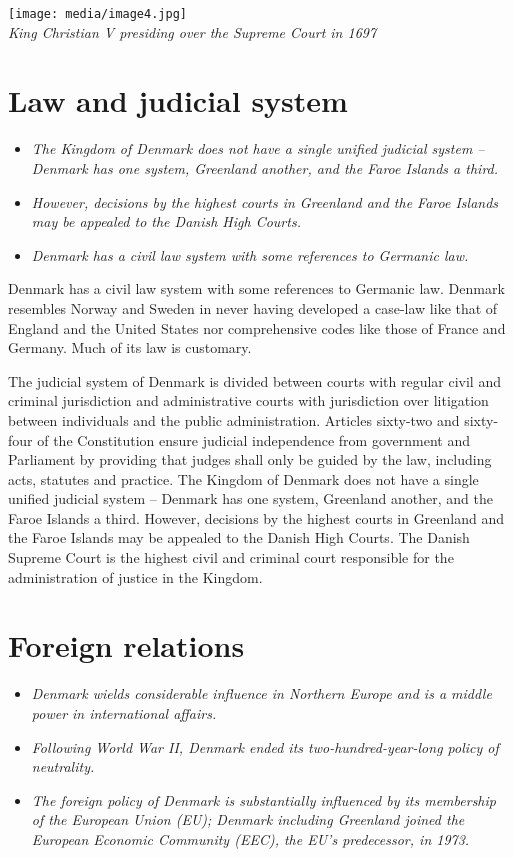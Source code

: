 \texttt{[image: media/image4.jpg]}\\
\emph{King Christian V presiding over the Supreme Court in 1697 }

\section{Law and judicial system}\label{law-and-judicial-system}

\begin{itemize}
\item
  \emph{The Kingdom of Denmark does not have a single unified judicial
  system -- Denmark has one system, Greenland another, and the Faroe
  Islands a third.}
\item
  \emph{However, decisions by the highest courts in Greenland and the
  Faroe Islands may be appealed to the Danish High Courts.}
\item
  \emph{Denmark has a civil law system with some references to Germanic
  law.}
\end{itemize}

Denmark has a civil law system with some references to Germanic law.
Denmark resembles Norway and Sweden in never having developed a case-law
like that of England and the United States nor comprehensive codes like
those of France and Germany. Much of its law is customary.

The judicial system of Denmark is divided between courts with regular
civil and criminal jurisdiction and administrative courts with
jurisdiction over litigation between individuals and the public
administration. Articles sixty-two and sixty-four of the Constitution
ensure judicial independence from government and Parliament by providing
that judges shall only be guided by the law, including acts, statutes
and practice. The Kingdom of Denmark does not have a single unified
judicial system -- Denmark has one system, Greenland another, and the
Faroe Islands a third. However, decisions by the highest courts in
Greenland and the Faroe Islands may be appealed to the Danish High
Courts. The Danish Supreme Court is the highest civil and criminal court
responsible for the administration of justice in the Kingdom.

\section{Foreign relations}\label{foreign-relations}

\begin{itemize}
\item
  \emph{Denmark wields considerable influence in Northern Europe and is
  a middle power in international affairs.}
\item
  \emph{Following World War II, Denmark ended its two-hundred-year-long
  policy of neutrality.}
\item
  \emph{The foreign policy of Denmark is substantially influenced by its
  membership of the European Union (EU); Denmark including Greenland
  joined the European Economic Community (EEC), the EU's predecessor, in
  1973.}
\end{itemize}

